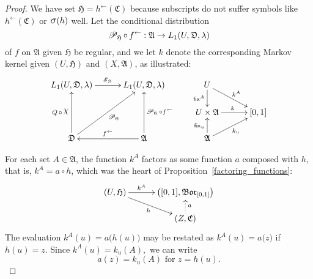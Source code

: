 \documentclass[
twoside=true,
paper=letter,
fontsize=9pt,
pagesize=auto,
leqno,
openany,
headsepline,
overfullrule,
]{scrbook}
\theoremstyle{plain}
\theoremstyle{plain}
\theoremstyle{definition}
\theoremstyle{bfnoteitalic}
\theoremstyle{bfnoteroman}
\newcommand{\sigalg}[1]{\mathfrak{#1}}
\newcommand{\cali}[1]{\mathscr{#1}}
\newcommand{\sfop}[1]{\mathsf{#1}}
\newcommand{\condexpop}[1]{\mathop{\cali{E}\hspace{-1pt}}\nolimits_{#1}}
\newcommand{\condprobop}[1]{\mathop{\cali{P}\hspace{-1pt}}\nolimits_{#1}}
\newcommand{\borel}{\mathfrak{Bor}}
\newcommand{\sagb}{\mathop{\hbox{\large{$\sigma$}}}\nolimits}
\newcommand{\charfunction}[1]{{\raisebox{2pt}{$\chi$}}_{#1}}
\newcommand{\preimage}[1]{#1^{\leftarrow}}
\newcommand{\sigmaalgebra}{\sigalg{A}}
\newcommand{\sigmaalgebraiii}{\sigalg{C}}
\newcommand{\funca}{a}
\newcommand{\funch}{h}
\newcommand{\funck}{k}
\newcommand{\function}{f}
\newcommand{\functioniii}{h}
\newcommand{\measurespace}{X}
\newcommand{\measurespaceiii}{Z}
\newcommand{\mspaceeltiii}{z}
\newcommand{\measureiii}{\lambda}
\newcommand{\seti}{A}
\newcommand{\fixinthefirst}[1]{\sfop{fix}_{#1}}
\newcommand{\fixinthesecond}[1]{\sfop{fix}^{#1}}
\newcommand{\uspace}{U}%
\newcommand{\uspaceelt}{u}
\newcommand{\uspacesig}{\sigalg{D}}
\begin{document}
\begin{proof}
We have set
$\sigalg{H} = \preimage{\functioniii}(\sigmaalgebraiii)$ because
subscripts do not suffer symbols like
$\preimage{\functioniii}(\sigmaalgebraiii)$ or $\sagb(\functioniii)$
well.
Let the conditional distribution
\[
\condprobop{\sigalg{H}}\circ\, \preimage{\function}:
\sigmaalgebra \to L_1(\uspace,\uspacesig,\measureiii)
\]
of $\function$ on $\sigmaalgebra$ given $\sigalg{H}$
be regular, and we let
$\funck$
denote the corresponding Markov kernel given
$(\uspace,\sigalg{H})$ and $(\measurespace,\sigmaalgebra)$, as illustrated:
\[
\xymatrix@R=16pt@C=30pt{
L_1(\uspace, \uspacesig, \measureiii) \ar[r]^{\condexpop{\sigalg{H}}}
& L_1(\uspace, \uspacesig, \measureiii)
& \uspace
\ar[d]_-{\fixinthesecond{\seti}}
\ar[dr]^{\funck^\seti}
\\
&
& \uspace\times\sigmaalgebra \ar[r]^{\funck}
& [0,1]
\\
\uspacesig
\ar[uu]^{Q\,\circ\,\charfunction{}}
\ar[uur]_{\condprobop{\sigalg{H}}}
& \sigmaalgebra
\ar[uu]_{\condprobop{\sigalg{H}}\circ \preimage{\function}}
\ar[l]_{\preimage{\function}}
& \sigmaalgebra
\ar[u]^{\fixinthefirst{\uspaceelt}}
\ar[ur]_{\funck_\uspaceelt}
&
\\
}
\]

For each set $\seti\in\sigmaalgebra$, the function
$\funck^\seti$ factors as some function $\funca$ composed with $\funch$,
that is, $\funck^\seti= \funca \circ \funch$,
which was the heart of Proposition~\ref{factoring_functions}:
\[
\xymatrix@R=14pt@C=30pt{
(\uspace,\sigalg{H})
\ar[r]^-{\funck^\seti}
\ar[dr]_{\functioniii}
& \bigl([0,1],\borel_{[0,1]}\bigr) \\
 & (\measurespaceiii,\sigmaalgebraiii) \ar@{.>}[u]_{\funca}\\
}
\]
The evaluation
$\funck^\seti(\uspaceelt)
=
a\bigl(\funch(\uspaceelt)\bigr)$
may be restated as
$\funck^\seti(\uspaceelt)
=
a\bigl(\mspaceeltiii)$
if
$\funch(\uspaceelt)
=
\mspaceeltiii$.
Since $\funck^\seti(\uspaceelt) = \funck_\uspaceelt(\seti),$
we can write
\[
a(\mspaceeltiii)=\funck_\uspaceelt(\seti) \text{ for } \mspaceeltiii = \funch(\uspaceelt).
\]


\end{proof}
\end{document}
